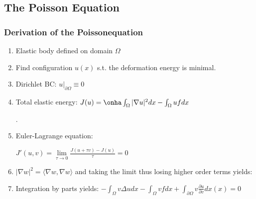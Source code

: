\documentclass[10pt,a4paper]{scrartcl}
\begin{document}
\begin{multicols*}{3}


\section{The Poisson Equation}



\subsubsection{Derivation of the Poissonequation}

\begin{enumerate}
\ncompaq
\item Elastic body defined on domain $\Omega$
\item Find configuration $u(x)$ s.t. the deformation energy is minimal.
\item Dirichlet BC: $u|_{\partial \Omega}\equiv 0$
\item Total elastic energy: $J(u)=\onha \int_\Omega |\nabla u|^2dx-\int_\Omega uf dx$ 

.
\item Euler-Lagrange equation: 

$J'(u,v)=\lim\limits_{\tau\rightarrow 0}\frac{J(u+\tau v)-J(u)}{\tau}=0$

\item $|\nabla w|^2=\langle \nabla w,\nabla w\rangle$ and taking the limit thus losing higher order terms yields:

\item Integration by parts yields: $-\int_\Omega v\Delta u dx-\int_\Omega vfdx+\int_{\partial\Omega}v\frac{\partial u}{\partial v}dx(x)=0$



\end{enumerate}
\end{multicols*}
\end{document}
